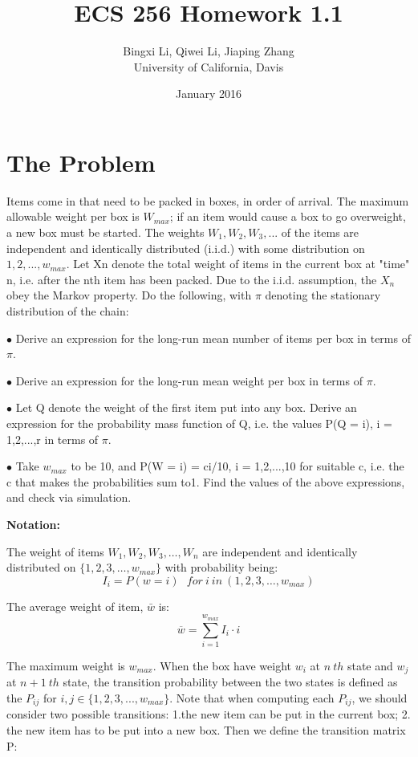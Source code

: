 \documentclass{article}
\title{ECS 256 Homework 1.1}
\author{Bingxi Li, Qiwei Li, Jiaping Zhang\footnotetext{bxli@ucdavis.edu, qwli@ucdavis.edu, jpzhang@ucdavis.edu} \\ University of California, Davis}
\date{January 2016}
\begin{document}
\maketitle

\section{The Problem}
Items come in that need to be packed in boxes, in order of arrival. The maximum allowable weight per box is $W_{max}$; if an item would cause a box to go overweight, a new box must be started.
\bigskip
The weights $W_1, W_2, W_3,...$ of the items are independent and identically distributed (i.i.d.) with some distribution on ${1,2,...,w_{max}}$. Let Xn denote the total weight of items in the current box at "time" n, i.e. after the nth item has been packed. Due to the i.i.d. assumption, the $X_n$ obey the Markov property.
\bigskip
Do the following, with $\pi$ denoting the stationary distribution of the chain:


$\bullet$ Derive an expression for the long-run mean number of items per box in terms of $\pi$.

$\bullet$ Derive an expression for the long-run mean weight per box in terms of $\pi$.

$\bullet$ Let Q denote the weight of the first item put into any box. Derive an expression for the probability mass function of Q, i.e. the values P(Q = i), i = 1,2,...,r in terms of $\pi$.

$\bullet$ Take $w_{max}$ to be 10, and P(W = i) = ci/10, i = 1,2,...,10 for suitable c, i.e. the c that makes the probabilities sum to1. Find the values of the above expressions, and check via simulation.



\textbf{Notation: }

The weight of items $W_1, W_2, W_3,\dots, W_n$ are independent and identically distributed on $\{1,2,3,\dots,w_{max}\}$ with probability being:
\begin{equation}
    I_i=P(w=i)\ \ \ for\ i\ in\ (1,2,3,\dots,w_{max})
\end{equation}

The average weight of item, $\bar{w}$ is:
\begin{equation}
    \overline{w}=\sum_{i=1}^{w_{max}} I_i \cdot i
\end{equation}

The maximum weight is $w_{max}$. When the box have weight $w_i$ at $n\ th$ state and $w_j$ at $n+1\ th$ state, the transition probability between the two states is defined as the $P_{ij}$ for $i,j\in \{1,2,3,...,w_{max}\}$. Note that when computing each $P_{ij}$, we should consider two possible transitions: 1.the new item can be put in the current box; 2. the new item has to be put into a new box. Then we define the transition matrix P:
\end{document}
